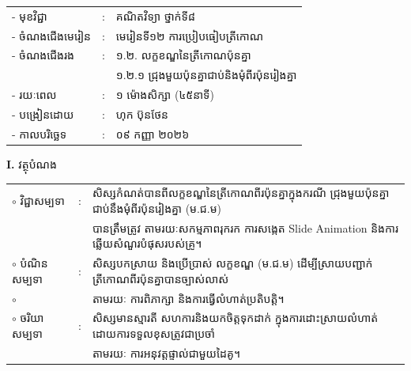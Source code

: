 \documentclass[a4paper,10pt]{article}
\begin{document}
{\renewcommand{\arraystretch}{1.10}
\hspace*{4.6cm}%
\begin{tabular}{@{}l l l@{}}
  - \hspace{0.35cm} មុខវិជ្ជា & : & គណិតវិទ្យា ថ្នាក់ទី៨ \\
  - \hspace{0.35cm} ចំណងជើងមេរៀន & : & មេរៀនទី១២ ការប្រៀបធៀបត្រីកោណ \\
  - \hspace{0.35cm} ចំណងជើងរង & : & ១.២. លក្ខខណ្ឌនៃត្រីកោណប៉ុនគ្នា \\
  & & ១.២.១ ជ្រុងមួយប៉ុនគ្នាជាប់និងមុំពីរប៉ុនរៀងគ្នា \\
  - \hspace{0.35cm} រយៈពេល & : & ១ ម៉ោងសិក្សា (៤៥នាទី) \\
  - \hspace{0.35cm} បង្រៀនដោយ & : & ហុក ប៊ុនថែន \\
  - \hspace{0.35cm} កាលបរិច្ឆេទ & : & ០៩ កញ្ញា ២០២៦ \\
\end{tabular}

\vspace{3pt}

\textbf{I.} {\muol វត្ថុបំណង}\\[2pt]
\hspace*{0.55cm}%
\begin{tabular}{@{}l l l@{}}
  $\circ$ \hspace{0.25cm} វិជ្ជាសម្បទា & : & សិស្សកំណត់បានពីលក្ខខណ្ឌនៃត្រីកោណពីរប៉ុនគ្នាក្នុងករណី ជ្រុងមួយប៉ុនគ្នាជាប់នឹងមុំពីរប៉ុនរៀងគ្នា (ម.ជ.ម) \\
  & & បានត្រឹមត្រូវ តាមរយៈសកម្មភាពរុករក ការសង្កេត Slide Animation និងការឆ្លើយសំណួរបំផុសរបស់គ្រូ។ \\
  $\circ$ \hspace{0.25cm} បំណិនសម្បទា & : & សិស្សបកស្រាយ និងប្រើប្រាស់ លក្ខខណ្ឌ (ម.ជ.ម) ដើម្បីស្រាយបញ្ជាក់ត្រីកោណពីរប៉ុនគ្នាបានច្បាស់លាស់ \\
  $\circ$ & & តាមរយៈ ការពិភាក្សា និងការធ្វើលំហាត់ប្រតិបត្តិ។ \\
  $\circ$ \hspace{0.25cm} ចរិយាសម្បទា & : & សិស្សមានស្មារតី សហការនិងយកចិត្តទុកដាក់ ក្នុងការដោះស្រាយលំហាត់ដោយការទទួលខុសត្រូវជាប្រចាំ \\
  & & តាមរយៈ ការអនុវត្តផ្ទាល់ជាមួយដៃគូ។ \\
\end{tabular}

}
\end{document}
